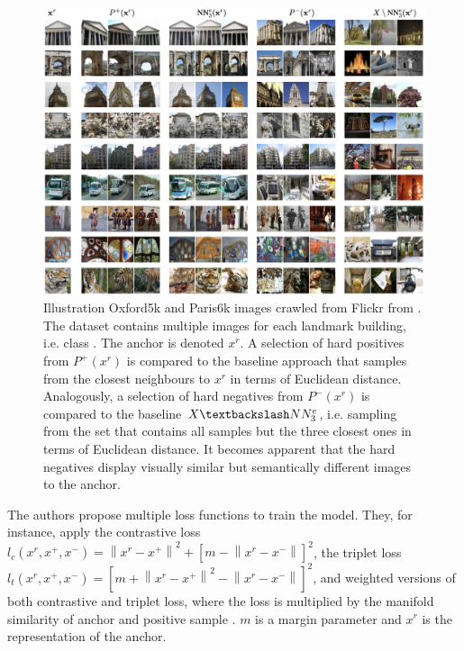 \begin{figure}[!htb] %
    \centering
    \includegraphics[width=360pt]{images/mining_manifold_examples.png}
    \caption{Illustration Oxford5k and Paris6k images crawled from Flickr from \citet{mining_manifolds_2018}.
    The dataset contains multiple images for each landmark building, i.e. class \citep{manifold_dataset}.
    The anchor is denoted $x^r$.
    A selection of hard positives from $P^+(x^r)$ is compared to the 
    baseline approach that samples from the closest neighbours to $x^r$ in 
    terms of Euclidean distance.
    Analogously, a selection of hard negatives from $P^-(x^r)$ 
    is compared to the baseline $X \textbackslash NN^e_3$, 
    i.e. sampling from the set that contains all samples but the three closest ones in 
    terms of Euclidean distance.
    It becomes apparent that the hard negatives display visually similar but 
    semantically different images to the anchor. %
    }
    \label{fig:manifold_mining_examples}
\end{figure}

The authors propose multiple loss functions to train the model.
They, for instance, apply the contrastive loss $l_c(x^r, x^+, x^-)= \left\| x^r - x^+ \right\|^2 + \left[ m - \left\| x^r - x^- \right\| \right]^2$, 
the triplet loss $l_t(x^r, x^+, x^-)= \left[ m +  \left\| x^r - x^+ \right\| ^2 - \left\| x^r - x^- \right\| \right]^2$, 
and weighted versions of both contrastive and triplet loss, where the loss is multiplied by the manifold similarity of anchor and positive sample \citep{mining_manifolds_2018}.
$m$ is a margin parameter and $x^r$ is the representation of the anchor.